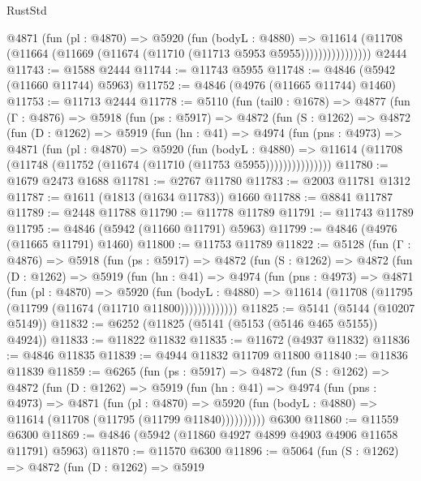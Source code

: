 \begin{lexlean}{RustStd}
\begin{coremodule}
                  @4871
                    (fun (pl : @4870) =>
                    @5920
                      (fun (bodyL : @4880) =>
                      @11614
                        (@11708 (@11664 (@11669 (@11674 (@11710 (@11713 @5953 @5955))))))))))))))))
    @2444
@11743 := @1588 @2444
@11744 := @11743 @5955
@11748 := @4846 (@5942 (@11660 @11744) @5963)
@11752 := @4846 (@4976 (@11665 @11744) @1460)
@11753 := @11713 @2444
@11778 := @5110
    (fun (tail0 : @1678) =>
    @4877
      (fun (Γ : @4876) =>
      @5918
        (fun (ps : @5917) =>
        @4872
          (fun (S : @1262) =>
          @4872
            (fun (D : @1262) =>
            @5919
              (fun (hn : @41) =>
              @4974
                (fun (pns : @4973) =>
                @4871
                  (fun (pl : @4870) =>
                  @5920
                    (fun (bodyL : @4880) =>
                    @11614 (@11708 (@11748 (@11752 (@11674 (@11710 (@11753 @5955)))))))))))))))
@11780 := @1679 @2473 @1688
@11781 := @2767 @11780
@11783 := @2003 @11781 @1312
@11787 := @1611 (@1813 (@1634 @11783)) @1660
@11788 := @8841 @11787
@11789 := @2448 @11788
@11790 := @11778 @11789
@11791 := @11743 @11789
@11795 := @4846 (@5942 (@11660 @11791) @5963)
@11799 := @4846 (@4976 (@11665 @11791) @1460)
@11800 := @11753 @11789
@11822 := @5128
    (fun (Γ : @4876) =>
    @5918
      (fun (ps : @5917) =>
      @4872
        (fun (S : @1262) =>
        @4872
          (fun (D : @1262) =>
          @5919
            (fun (hn : @41) =>
            @4974
              (fun (pns : @4973) =>
              @4871
                (fun (pl : @4870) =>
                @5920
                  (fun (bodyL : @4880) =>
                  @11614 (@11708 (@11795 (@11799 (@11674 (@11710 @11800)))))))))))))
@11825 := @5141 (@5144 (@10207 @5149))
@11832 := @6252 (@11825 (@5141 (@5153 (@5146 @465 @5155)) @4924))
@11833 := @11822 @11832
@11835 := @11672 (@4937 @11832)
@11836 := @4846 @11835
@11839 := @4944 @11832 @11709 @11800
@11840 := @11836 @11839
@11859 := @6265
    (fun (ps : @5917) =>
    @4872
      (fun (S : @1262) =>
      @4872
        (fun (D : @1262) =>
        @5919
          (fun (hn : @41) =>
          @4974
            (fun (pns : @4973) =>
            @4871
              (fun (pl : @4870) =>
              @5920 (fun (bodyL : @4880) => @11614 (@11708 (@11795 (@11799 @11840))))))))))
    @6300
@11860 := @11559 @6300
@11869 := @4846 (@5942 (@11860 @4927 @4899 @4903 @4906 @11658 @11791) @5963)
@11870 := @11570 @6300
@11896 := @5064
    (fun (S : @1262) =>
    @4872
      (fun (D : @1262) =>
      @5919

\end{coremodule}
\end{lexlean}
